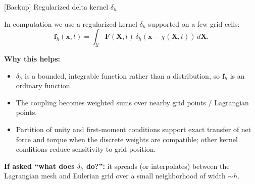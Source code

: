 \documentclass[aspectratio=169,11pt]{beamer}
\begin{document}
\begin{frame}{[Backup] Regularized delta kernel $\delta_h$}
\small

In computation we use a regularized kernel $\delta_h$ supported on a few grid cells:
\[
\mathbf{f}_h(\mathbf{x},t)=\int_{\mathcal U}\mathbf{F}(\mathbf{X},t)\,
\delta_h(\mathbf{x}-\chi(\mathbf{X},t))\,d\mathbf{X}.
\]

\medskip
\textbf{Why this helps:}
\begin{itemize}\itemsep3pt
\item $\delta_h$ is a bounded, integrable function rather than a distribution, so $\mathbf{f}_h$ is an ordinary function.
\item The coupling becomes weighted sums over nearby grid points / Lagrangian points.
\item Partition of unity and first-moment conditions support exact transfer of net force and torque when the discrete weights are compatible; other kernel conditions reduce sensitivity to grid position.
\end{itemize}

\medskip
\textbf{If asked “what does $\delta_h$ do?”:}
it spreads (or interpolates) between the Lagrangian mesh and Eulerian grid over a small neighborhood of width $\sim h$.

\end{frame}
\end{document}
